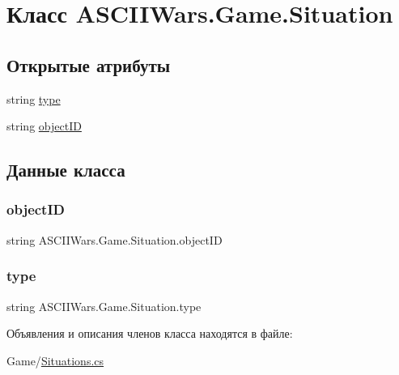 \hypertarget{class_a_s_c_i_i_wars_1_1_game_1_1_situation}{}\section{Класс A\+S\+C\+I\+I\+Wars.\+Game.\+Situation}
\label{class_a_s_c_i_i_wars_1_1_game_1_1_situation}
\subsection*{Открытые атрибуты}
\begin{DoxyCompactItemize}
\item 
string \hyperlink{class_a_s_c_i_i_wars_1_1_game_1_1_situation_aefc60f917d443f47bdec48d9c45af5df}{type}
\item 
string \hyperlink{class_a_s_c_i_i_wars_1_1_game_1_1_situation_a84a39566fb7d8b3efa59e990597ac039}{object\+ID}
\end{DoxyCompactItemize}


\subsection{Данные класса}
\hypertarget{class_a_s_c_i_i_wars_1_1_game_1_1_situation_a84a39566fb7d8b3efa59e990597ac039}{}\label{class_a_s_c_i_i_wars_1_1_game_1_1_situation_a84a39566fb7d8b3efa59e990597ac039} 
\subsubsection{\texorpdfstring{object\+ID}{objectID}}
{\footnotesize\ttfamily string A\+S\+C\+I\+I\+Wars.\+Game.\+Situation.\+object\+ID}

\hypertarget{class_a_s_c_i_i_wars_1_1_game_1_1_situation_aefc60f917d443f47bdec48d9c45af5df}{}\label{class_a_s_c_i_i_wars_1_1_game_1_1_situation_aefc60f917d443f47bdec48d9c45af5df} 
\subsubsection{\texorpdfstring{type}{type}}
{\footnotesize\ttfamily string A\+S\+C\+I\+I\+Wars.\+Game.\+Situation.\+type}



Объявления и описания членов класса находятся в файле\+:\begin{DoxyCompactItemize}
\item 
Game/\hyperlink{_situations_8cs}{Situations.\+cs}\end{DoxyCompactItemize}
